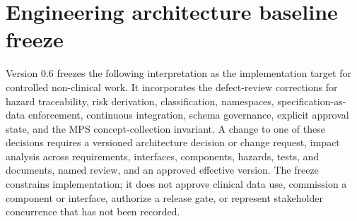 \documentclass[11pt,letterpaper]{article}
\begin{document}
\section{Engineering architecture baseline freeze}

Version 0.6 freezes the following interpretation as the implementation target for controlled non-clinical work. It incorporates the defect-review corrections for hazard traceability, risk derivation, classification, namespaces, specification-as-data enforcement, continuous integration, schema governance, explicit approval state, and the MPS concept-collection invariant. A change to one of these decisions requires a versioned architecture decision or change request, impact analysis across requirements, interfaces, components, hazards, tests, and documents, named review, and an approved effective version. The freeze constrains implementation; it does not approve clinical data use, commission a component or interface, authorize a release gate, or represent stakeholder concurrence that has not been recorded.
\end{document}
